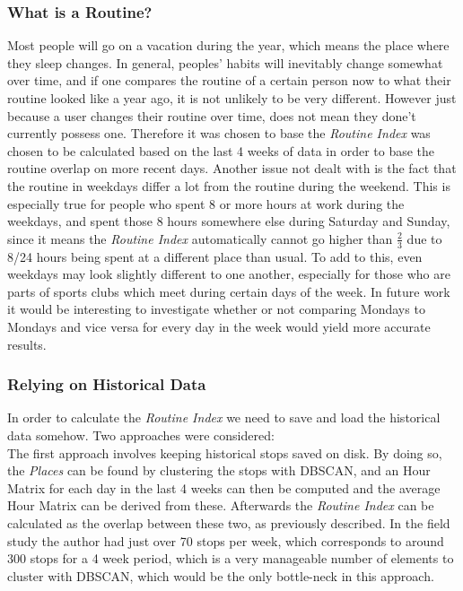 \subsubsection*{What is a Routine?}
Most people will go on a vacation during the year, which means the place where they sleep changes. In general, peoples' habits will inevitably change somewhat over time, and if one compares the routine of a certain person now to what their routine looked like a year ago, it is not unlikely to be very different. However just because a user changes their routine over time, does not mean they done't currently possess one. Therefore it was chosen to base the \textit{Routine Index} was chosen to be calculated based on the last 4 weeks of data in order to base the routine overlap on more recent days. Another issue not dealt with is the fact that the routine in weekdays differ a lot from the routine during the weekend. This is especially true for people who spent 8 or more hours at work during the weekdays, and spent those 8 hours somewhere else during Saturday and Sunday, since it means the \textit{Routine Index} automatically cannot go higher than $\frac{2}{3}$ due to  8/24 hours being spent at a different place than usual. To add to this, even weekdays may look slightly different to one another, especially for those who are parts of sports clubs which meet during certain days of the week. In future work it would be interesting to investigate whether or not comparing Mondays to Mondays and vice versa for every day in the week would yield more accurate results.

\subsubsection*{Relying on Historical Data}
In order to calculate the \textit{Routine Index} we need to save and load the historical data somehow. Two approaches were considered:\\

The first approach involves keeping historical stops saved on disk. By doing so, the \textit{Places} can be found by clustering the stops with DBSCAN, and an Hour Matrix for each day in the last 4 weeks can then be computed and the average Hour Matrix can be derived from these. Afterwards the \textit{Routine Index} can be calculated as the overlap between these two, as previously described. In the field study the author had just over 70 stops per week, which corresponds to around 300 stops for a 4 week period, which is a very manageable number of elements to cluster with DBSCAN, which would be the only bottle-neck in this approach.\\

